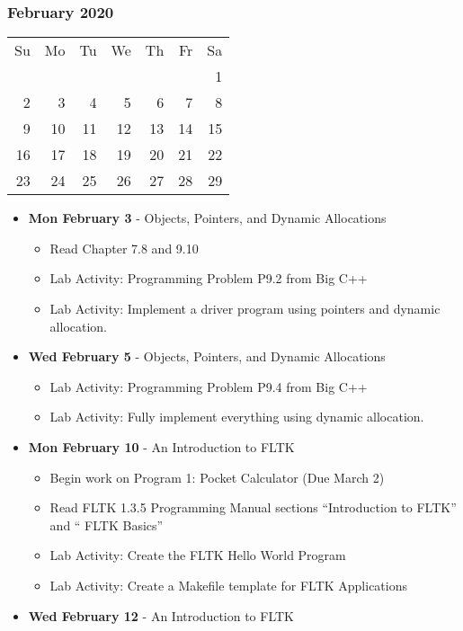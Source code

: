 \subsubsection*{February 2020}
\begin{tabular}{rrrrrrr}
Su & Mo & Tu & We & Th & Fr & Sa\\
   &    &    &    &    &    &  1\\ 
 2 &  3 &  4 &  5 &  6 &  7 &  8\\ 
 9 & 10 & 11 & 12 & 13 & 14 & 15\\ 
16 & 17 & 18 & 19 & 20 & 21 & 22\\ 
23 & 24 & 25 & 26 & 27 & 28 & 29\\ 
\end{tabular}
\begin{itemize}
\item\textbf{Mon February  3} - Objects, Pointers, and Dynamic Allocations
    \begin{itemize}
        \item Read Chapter 7.8 and 9.10
        \item Lab Activity: Programming Problem P9.2 from Big C++
        \item Lab Activity: Implement a driver program using pointers and dynamic
            allocation.
    \end{itemize}
\item\textbf{Wed February  5} - Objects, Pointers, and Dynamic Allocations
    \begin{itemize}
        \item Lab Activity: Programming Problem P9.4 from Big C++
        \item Lab Activity: Fully implement everything using dynamic allocation.
    \end{itemize}
\item\textbf{Mon February 10} - An Introduction to FLTK
    \begin{itemize}
        \item Begin work on Program 1: Pocket Calculator (Due March 2)
        \item Read FLTK 1.3.5 Programming Manual sections 
            ``Introduction to FLTK'' and `` FLTK Basics''
        \item Lab Activity: Create the FLTK Hello World Program
        \item Lab Activity: Create a Makefile template for FLTK
            Applications
    \end{itemize}
\item\textbf{Wed February 12} - An Introduction to FLTK

\end{itemize}
